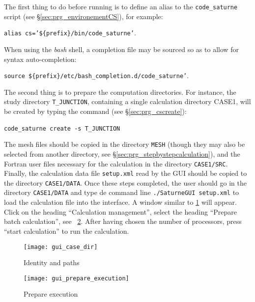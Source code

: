 The first thing to do before running \CS is to define an alias to the \texttt{code\_saturne} script
(see \S\ref{sec:prg_environementCS}), for example:
\begin{center}
\texttt{alias cs='\$\{prefix\}/bin/code\_saturne'}.
\end{center}
When using the \emph{bash} shell, a completion file may be sourced so as to
allow for syntax auto-completion:
\begin{center}
\texttt{source \$\{prefix\}/etc/bash\_completion.d/code\_saturne'}.
\end{center}
The second thing is to prepare the computation directories. For instance, the study directory \texttt{T\_JUNCTION}, containing a single calculation directory CASE1, will be created by typing the command (see \S\ref{sec:prg_cscreate}):\
\begin{center}
\texttt{code\_saturne create -s T\_JUNCTION}\
\end{center}
The mesh files should be copied in the directory \texttt{MESH} (though they may also be selected from another directory, see \S\ref{sec:prg_stepbystepcalculation}),
and the Fortran user files necessary for the calculation in the directory \texttt{CASE1/SRC}.  Finally, the calculation data file \texttt{setup.xml} read by the GUI should be copied to the directory \texttt{CASE1/DATA}.
Once these steps completed, the user should go in the directory \texttt{CASE1/DATA} and type de command line \texttt{./SaturneGUI setup.xml} to load the calculation file into the interface. A window similar to \figurename\ref{fig:3_e1} will appear. Click on the heading ``Calculation management'', select the heading ``Prepare batch calculation'', see \figurename~\ref{fig:43_e1}. After having chosen the number of processors, press ``start calculation'' to run the calculation.

\begin{figure}[!ht]
\begin{center}
\texttt{[image: gui\_case\_dir]}
\caption{Identity and paths}
\label{fig:3_e1}
\end{center}
\end{figure}

\begin{figure}[!ht]
\begin{center}
\texttt{[image: gui\_prepare\_execution]}
\caption{Prepare execution}
\label{fig:43_e1}
\end{center}
\end{figure}

